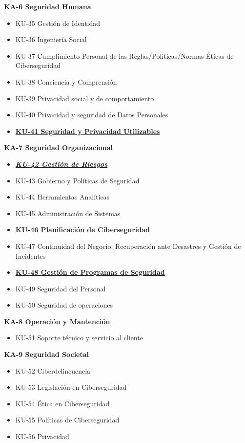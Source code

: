 \begin{itemize}
\textbf{KA-6 Seguridad Humana}
\begin{itemize}
  \item KU-35 Gestión de Identidad
  \item KU-36 Ingeniería Social
  \item KU-37 Cumplimiento Personal de las Reglas/Políticas/Normas Éticas de Ciberseguridad
  \item KU-38 Conciencia y Comprensión
  \item KU-39 Privacidad social y de comportamiento 
  \item KU-40 Privacidad y seguridad  de Datos Personales
  \item \underline{\textbf{KU-41 Seguridad y Privacidad Utilizables}}
\end{itemize}

\textbf{KA-7 Seguridad Organizacional}
\begin{itemize}

  \item \underline{\textit{\textbf{ KU-42 Gestión de Riesgos}}}
  \item KU-43 Gobierno y Políticas de Seguridad
  \item KU-44 Herramientas Analíticas
  \item KU-45 Administración de Sistemas
  \item \underline{\textbf{KU-46 Planificación de Ciberseguridad}}
  \item KU-47 Continuidad del Negocio, Recuperación ante Desastres y Gestión de Incidentes
  \item \underline{\textbf{KU-48 Gestión de Programas de Seguridad}}
  \item KU-49 Seguridad del Personal
  \item KU-50 Seguridad de operaciones
\end{itemize}
\textbf{KA-8 Operación y Mantención}
\begin{itemize}
  \item KU-51 Soporte técnico y servicio al cliente
\end{itemize}

\textbf{KA-9 Seguridad Societal}
\begin{itemize}
 
  \item KU-52 Ciberdelincuencia
  \item KU-53 Legislación en Ciberseguridad
  \item KU-54 Ética en Ciberseguridad
  \item KU-55 Políticas de Ciberseguridad
  \item KU-56 Privacidad
\end{itemize}

    
\end{itemize}


